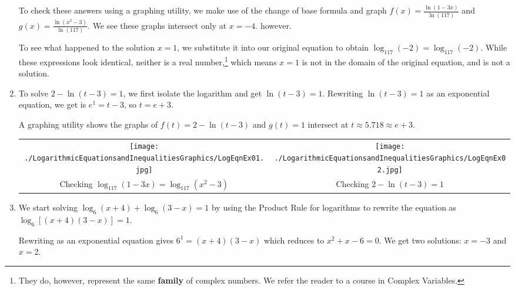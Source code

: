 \documentclass{ximera}
\begin{document}
\begin{example}
\begin{enumerate}
To check these answers using a graphing utility,  we make use of the change of base formula and graph $f(x) = \frac{\ln(1-3x)}{\ln(117)}$ and $g(x) = \frac{\ln\left(x^2-3\right)}{\ln(117)}$.  We see these graphs intersect only at $x=-4$. however.  

\smallskip

To see what happened to the solution $x=1$, we substitute it into our original equation to obtain  $\log_{117}(-2) =  \log_{117}(-2)$.  While these expressions look identical, neither is a real number,\footnote{They do, however, represent the same \textbf{family} of complex numbers.  We refer the reader to a course in Complex Variables.} which means $x=1$ is not in the domain of the original equation, and is not a solution.    


\item  To solve  $2 - \ln(t-3) = 1$, we first isolate the logarithm and get $\ln(t-3) = 1$. Rewriting $\ln(t-3) = 1$ as an exponential equation, we get is $e^{1} = t-3$, so $t =e+3$. 

\smallskip

A graphing utility shows the graphs of $f(t) = 2 - \ln(t-3)$ and $g(t) = 1$ intersect at $t \approx   5.718 \approx e+3$.

\begin{center}

\begin{tabular}{cc}

\texttt{[image: ./LogarithmicEquationsandInequalitiesGraphics/LogEqnEx01.jpg]} &

\texttt{[image: ./LogarithmicEquationsandInequalitiesGraphics/LogEqnEx02.jpg]}  \\

Checking $\log_{117}(1-3x) = \log_{117}\left(x^2-3\right)$
 
 &
 
 Checking $2 - \ln(t-3) = 1$
 
\end{tabular}

\end{center}


\item We  start solving $\log_{6}(x+4) + \log_{6}(3-x) = 1$ by using the Product Rule for logarithms to rewrite the equation as  $\log_{6}\left[(x+4)(3-x)\right] = 1$.  

\smallskip

Rewriting as an exponential equation gives $6^{1} = (x+4)(3-x)$ which reduces to $x^2+x-6 = 0$.  We get two solutions: $x=-3$ and $x=2$.   


\end{enumerate}
\end{example}
\end{document}
